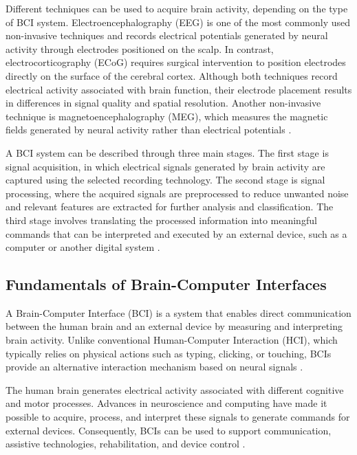 Different techniques can be used to acquire brain activity, depending on the type of BCI system. Electroencephalography (EEG) is one of the most commonly used non-invasive techniques and records electrical potentials generated by neural activity through electrodes positioned on the scalp. In contrast, electrocorticography (ECoG) requires surgical intervention to position electrodes directly on the surface of the cerebral cortex. Although both techniques record electrical activity associated with brain function, their electrode placement results in differences in signal quality and spatial resolution. Another non-invasive technique is magnetoencephalography (MEG), which measures the magnetic fields generated by neural activity rather than electrical potentials \cite{hassanien2015}.

A BCI system can be described through three main stages. The first stage is signal acquisition, in which electrical signals generated by brain activity are captured using the selected recording technology. The second stage is signal processing, where the acquired signals are preprocessed to reduce unwanted noise and relevant features are extracted for further analysis and classification. The third stage involves translating the processed information into meaningful commands that can be interpreted and executed by an external device, such as a computer or another digital system \cite{hassanien2015}.

\subsection{Fundamentals of Brain-Computer Interfaces}

A Brain-Computer Interface (BCI) is a system that enables direct communication between the human brain and an external device by measuring and interpreting brain activity. Unlike conventional Human-Computer Interaction (HCI), which typically relies on physical actions such as typing, clicking, or touching, BCIs provide an alternative interaction mechanism based on neural signals \cite{ramadan2015basics}.

The human brain generates electrical activity associated with different cognitive and motor processes. Advances in neuroscience and computing have made it possible to acquire, process, and interpret these signals to generate commands for external devices. Consequently, BCIs can be used to support communication, assistive technologies, rehabilitation, and device control \cite{setiono2018rccar}.

